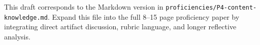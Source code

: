 \documentclass[12pt]{article}
\begin{document}
\begin{titlepage}\begin{center}\vspace*{0.2\textheight}{\Large\bfseries Proficiency 4: Content Knowledge and Application\par}\vspace{2em}{\PortfolioAuthor\par}{\PortfolioAffiliation\par}{\PortfolioProgram\par}\vspace{2em}{\PortfolioDate\par}\end{center}\end{titlepage}
This draft corresponds to the Markdown version in \texttt{proficiencies/P4-content-knowledge.md}. Expand this file into the full 8--15 page proficiency paper by integrating direct artifact discussion, rubric language, and longer reflective analysis.
\end{document}
